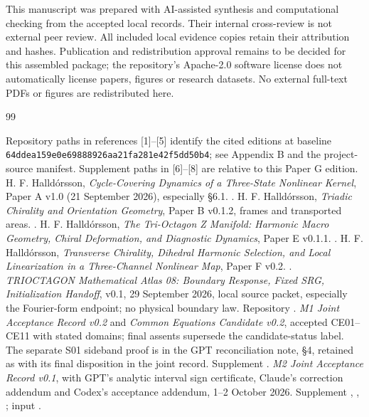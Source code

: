 \documentclass[11pt,a4paper]{article}
\begin{document}
This manuscript was prepared with AI-assisted synthesis and computational checking from the accepted local records. Their internal cross-review is not external peer review. All included local evidence copies retain their attribution and hashes. Publication and redistribution approval remains to be decided for this assembled package; the repository's Apache-2.0 software license does not automatically license papers, figures or research datasets. No external full-text PDFs or figures are redistributed here.

\begin{thebibliography}{99}\small
\item[] Repository paths in references [1]--[5] identify the cited editions at baseline \nolinkurl{64ddea159e0e69888926aa21fa281e42f5dd50b4}; see Appendix B and the project-source manifest. Supplement paths in [6]--[8] are relative to this Paper G edition.
 H. F. Halldórsson, \emph{Cycle-Covering Dynamics of a Three-State Nonlinear Kernel}, Paper A v1.0 (21 September 2026), especially \S6.1. .
 H. F. Halldórsson, \emph{Triadic Chirality and Orientation Geometry}, Paper B v0.1.2, frames and transported areas. .
 H. F. Halldórsson, \emph{The Tri-Octagon Z Manifold: Harmonic Macro Geometry, Chiral Deformation, and Diagnostic Dynamics}, Paper E v0.1.1. .
 H. F. Halldórsson, \emph{Transverse Chirality, Dihedral Harmonic Selection, and Local Linearization in a Three-Channel Nonlinear Map}, Paper F v0.2. .
 \emph{TRIOCTAGON Mathematical Atlas 08: Boundary Response, Fixed SRG, Initialization Handoff}, v0.1, 29 September 2026, local source packet, especially the Fourier-form endpoint; no physical boundary law. Repository .
 \emph{M1 Joint Acceptance Record v0.2} and \emph{Common Equations Candidate v0.2}, accepted CE01--CE11 with stated domains; final assents supersede the candidate-status label. The separate S01 sideband proof is in the GPT reconciliation note, \S4, retained as  with its final disposition in the joint record. Supplement .
 \emph{M2 Joint Acceptance Record v0.1}, with GPT's analytic interval sign certificate, Claude's correction addendum and Codex's acceptance addendum, 1--2 October 2026. Supplement , , ; input .

\end{thebibliography}
\end{document}
